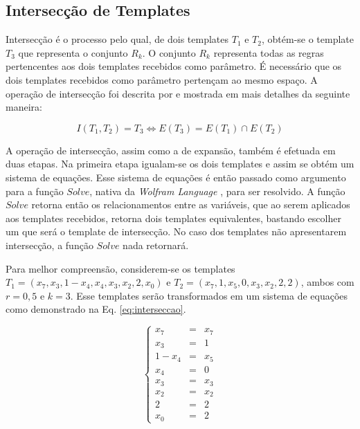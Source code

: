 \newpage\newpage
\subsection{Intersecção de Templates}
Intersecção é o processo pelo qual, de dois templates $T_1$ e $T_2$, obtém-se o template $T_3$ que representa o conjunto $R_k$. O conjunto $R_k$ representa todas as regras pertencentes aos dois templates recebidos como parâmetro. É necessário que os dois templates recebidos como parâmetro pertençam ao mesmo espaço. A operação de intersecção foi descrita por  e mostrada em mais detalhes da seguinte maneira:

\begin{equation}
I(T_1,T_2)=T_3 \Leftrightarrow E(T_3) = E(T_1) \cap E(T_2)
\end{equation}

A operação de intersecção, assim como a de expansão, também é efetuada em duas etapas. Na primeira etapa igualam-se os dois templates e assim se obtém um sistema de equações. Esse sistema de equações é então passado como argumento para a função $Solve$, nativa da \textit{Wolfram Language} \cite{woframMathematica10}, para ser resolvido. A função $Solve$ retorna então os relacionamentos entre as variáveis, que ao serem aplicados aos templates recebidos, retorna dois templates equivalentes, bastando escolher um que será o template de intersecção. No caso dos templates não apresentarem intersecção, a função $Solve$ nada retornará.

Para melhor compreensão, considerem-se os templates $T_1 = (x_7,x_3,1-x_4,x_4,x_3,x_2,2,x_0)$ e $T_2 = (x_7,1,x_5,0,x_3,x_2,2,2)$, ambos com $r=0{,}5$ e $k=3$. Esse templates serão transformados em um sistema de equações como demonstrado na Eq. \eqref{eq:interseccao}.

\begin{equation}
\left\{\begin{matrix}
x_7   & = & x_7 \\ 
x_3   & = & 1 \\ 
1-x_4 & = & x_5    \\ 
x_4   & = & 0    \\ 
x_3   & = & x_3    \\ 
x_2   & = & x_2   \\ 
2     & = & 2   \\ 
x_0   & = & 2
\end{matrix}\right.
\label{eq:interseccao}
\end{equation}

